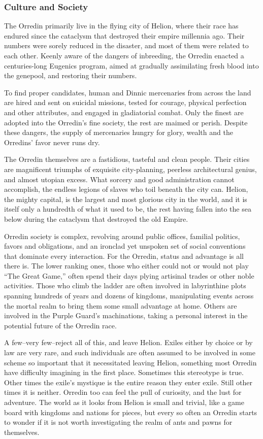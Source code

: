 \documentclass[oneside,11pt,english]{book}
\begin{document}
\subsubsection*{Culture and Society} 
The Orredin primarily live in the flying city of Helion, where their race has endured since the cataclysm that destroyed their empire millennia ago. Their numbers were sorely reduced in the disaster, and most of them were related to each other. Keenly aware of the dangers of inbreeding, the Orredin enacted a centuries-long Eugenics program, aimed at gradually assimilating fresh blood into the genepool, and 
restoring their numbers.

To find proper candidates, human and Dinnic mercenaries from across the land 
are hired and sent on suicidal missions, tested for courage, physical perfection and other attributes, and 
engaged in gladiatorial combat. Only the finest are adopted into the Orredin’s fine society, the rest are 
maimed or perish. Despite these dangers, the supply of mercenaries hungry for glory, wealth and the 
Orredins’ favor never runs dry. 

The Orredin themselves are a fastidious, tasteful and clean people. Their cities are magnificent triumphs 
of exquisite city-planning, peerless architectural genius, and almost utopian excess. What sorcery and 
good administration cannot accomplish, the endless legions of slaves who toil beneath the city can. 
Helion, the mighty capital, is the largest and most glorious city in the world, and it is itself only a 
hundredth of what it used to be, the rest having fallen into the sea below during the cataclysm that 
destroyed the old Empire. 

Orredin society is complex, revolving around public offices, familial politics, favors and obligations, and 
an ironclad yet unspoken set of social conventions that dominate every interaction. For the Orredin, status 
and advantage is all there is. The lower ranking ones, those who either could not or would not play “The 
Great Game,” often spend their days plying artisinal trades or other noble activities. Those who climb the 
ladder are often involved in labyrinthine plots spanning hundreds of years and dozens of kingdoms, 
manipulating events across the mortal realm to bring them some small advantage at home. Others are 
involved in the Purple Guard’s machinations, taking a personal interest in the potential future of the 
Orredin race. 

A few--very few--reject all of this, and leave Helion. Exiles either by choice or by law are very rare, and 
such individuals are often assumed to be involved in some scheme so important that it necessitated 
leaving Helion, something most Orredin have difficulty imagining in the first place. Sometimes this 
stereotype is true. Other times the exile’s mystique is the entire reason they enter exile. Still other times it 
is neither. Orredin too can feel the pull of curiosity, and the lust for adventure. The world as it looks from 
Helion is small and trivial, like a game board with kingdoms and nations for pieces, but every so often an 
Orredin starts to wonder if it is not worth investigating the realm of ants and pawns for themselves. 
\end{document}
